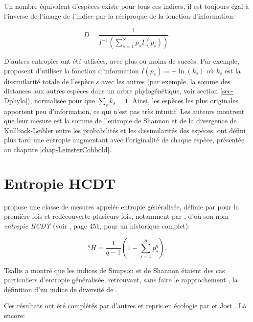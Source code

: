 \documentclass[
  11pt,
  french,
  a4paper,
  extrafontsizes,onecolumn,openright
  ]{memoir}
\begin{document}
Un nombre équivalent d'espèces existe pour tous ces indices, il est toujours égal à l'inverse de l'image de l'indice par la réciproque de la fonction d'information:

\begin{equation}
  \label{eq:Gregorius2014}
  D = \frac{1}{I^{-1}\left(\sum^S_{s=1}{p_s I(p_s)}\right)}.
\end{equation}

D'autres entropies ont été utlisées, avec plus ou moins de succès.
Par exemple, \textcite{Ricotta2003c} proposent d'utiliser la fonction d'information \(I(p_s)=-\ln(k_s)\) où \(k_s\) est la dissimilarité totale de l'espèce \(s\) avec les autres (par exemple, la somme des distances aux autres espèces dans un arbre phylogénétique, voir section \ref{sec-Dphylo}), normalisée pour que \(\sum_s{k_s}=1\).
Ainsi, les espèces les plus originales apportent peu d'information, ce qui n'est pas très intuitif.
Les auteurs montrent que leur mesure est la somme de l'entropie de Shannon et de la divergence de Kullback-Leibler entre les probabilités et les dissimilarités des espèces.
\textcite{Ricotta2006b} ont défini plus tard une entropie augmentant avec l'originalité de chaque espèce, présentée au chapitre \ref{chap-LeinsterCobbold}.

\hypertarget{entropie-hcdt}{%
\section{Entropie HCDT}\label{entropie-hcdt}}

\textcite{Tsallis1988} propose une classe de mesures appelée entropie généralisée, définie par \textcite{Havrda1967} pour la première fois et redécouverte plusieurs fois, notamment par \textcite{Daroczy1970}, d'où son nom \emph{entropie HCDT} (voir \textcite{Mendes2008}, page 451, pour un historique complet):

\begin{equation}
  \label{eq:HCDT}
  ^{q}\!H = \frac{1}{q-1}\left(1-\sum^S_{s=1}{p^q_s}\right).
\end{equation}

Tsallis a montré que les indices de Simpson et de Shannon étaient des cas particuliers d'entropie généralisée, retrouvant, sans faire le rapprochement \autocite{Ricotta2005}, la définition d'un indice de diversité de \textcite{Patil1982}.

Ces résultats ont été complétés par d'autres et repris en écologie par \textcite{Keylock2005} et Jost \autocite*{Jost2006,Jost2007}.
Là encore:
\end{document}
